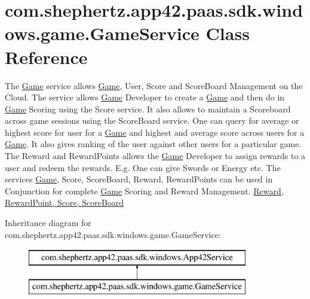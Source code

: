 \hypertarget{classcom_1_1shephertz_1_1app42_1_1paas_1_1sdk_1_1windows_1_1game_1_1_game_service}{\section{com.\+shephertz.\+app42.\+paas.\+sdk.\+windows.\+game.\+Game\+Service Class Reference}
\label{classcom_1_1shephertz_1_1app42_1_1paas_1_1sdk_1_1windows_1_1game_1_1_game_service}
}


The \hyperlink{classcom_1_1shephertz_1_1app42_1_1paas_1_1sdk_1_1windows_1_1game_1_1_game}{Game} service allows \hyperlink{classcom_1_1shephertz_1_1app42_1_1paas_1_1sdk_1_1windows_1_1game_1_1_game}{Game}, User, Score and Score\+Board Management on the Cloud. The service allows \hyperlink{classcom_1_1shephertz_1_1app42_1_1paas_1_1sdk_1_1windows_1_1game_1_1_game}{Game} Developer to create a \hyperlink{classcom_1_1shephertz_1_1app42_1_1paas_1_1sdk_1_1windows_1_1game_1_1_game}{Game} and then do in \hyperlink{classcom_1_1shephertz_1_1app42_1_1paas_1_1sdk_1_1windows_1_1game_1_1_game}{Game} Scoring using the Score service. It also allows to maintain a Scoreboard across game sessions using the Score\+Board service. One can query for average or highest score for user for a \hyperlink{classcom_1_1shephertz_1_1app42_1_1paas_1_1sdk_1_1windows_1_1game_1_1_game}{Game} and highest and average score across users for a \hyperlink{classcom_1_1shephertz_1_1app42_1_1paas_1_1sdk_1_1windows_1_1game_1_1_game}{Game}. It also gives ranking of the user against other users for a particular game. The Reward and Reward\+Points allows the \hyperlink{classcom_1_1shephertz_1_1app42_1_1paas_1_1sdk_1_1windows_1_1game_1_1_game}{Game} Developer to assign rewards to a user and redeem the rewards. E.\+g. One can give Swords or Energy etc. The services \hyperlink{classcom_1_1shephertz_1_1app42_1_1paas_1_1sdk_1_1windows_1_1game_1_1_game}{Game}, Score, Score\+Board, Reward, Reward\+Points can be used in Conjunction for complete \hyperlink{classcom_1_1shephertz_1_1app42_1_1paas_1_1sdk_1_1windows_1_1game_1_1_game}{Game} Scoring and Reward Management. \hyperlink{classcom_1_1shephertz_1_1app42_1_1paas_1_1sdk_1_1windows_1_1game_1_1_game_service}{Reward, Reward\+Point, Score, Score\+Board}  


Inheritance diagram for com.\+shephertz.\+app42.\+paas.\+sdk.\+windows.\+game.\+Game\+Service\+:\begin{figure}[H]
\begin{center}
\leavevmode
\includegraphics[height=2.000000cm]{classcom_1_1shephertz_1_1app42_1_1paas_1_1sdk_1_1windows_1_1game_1_1_game_service}
\end{center}
\end{figure}
